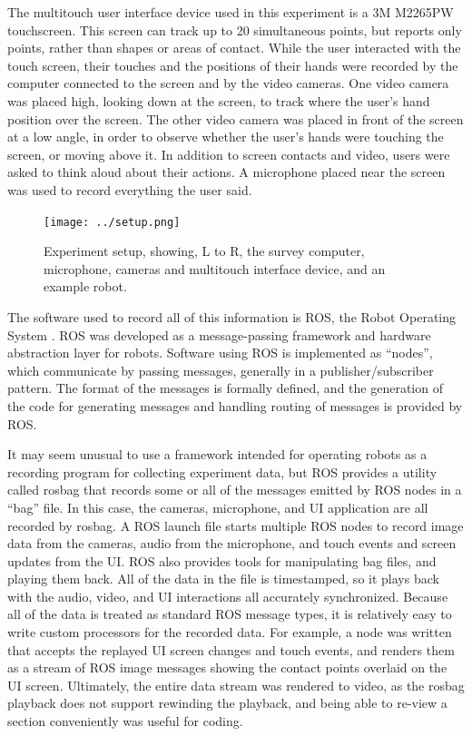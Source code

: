 The multitouch user interface device used in this experiment is a 3M M2265PW touchscreen. 
This screen can track up to 20 simultaneous points, but reports only points, rather than shapes or areas of contact. 
While the user interacted with the touch screen, their touches and the positions of their hands were recorded by the computer connected to the screen and by the video cameras. 
One video camera was placed high, looking down at the screen, to track where the user's hand position over the screen. 
The other video camera was placed in front of the screen at a low angle, in order to observe whether the user's hands were touching the screen, or moving above it. 
In addition to screen contacts and video, users were asked to think aloud about their actions.
A microphone placed near the screen was used to record everything the user said. 

\begin{figure}
	\centering
	\texttt{[image: ../setup.png]}
	\caption{Experiment setup, showing, L to R, the survey computer, microphone, cameras and multitouch interface device, and an example robot.}
	\label{fig:experiment_setup}
\end{figure}

The software used to record all of this information is ROS, the Robot Operating System \citep{ROS_announcement_paper}. 
ROS was developed as a message-passing framework and hardware abstraction layer for robots. 
Software using ROS is implemented as ``nodes'', which communicate by passing messages, generally in a publisher/subscriber pattern. 
The format of the messages is formally defined, and the generation of the code for generating messages and handling routing of messages is provided by ROS. 

It may seem unusual to use a framework intended for operating robots as a recording program for collecting experiment data, but ROS provides a utility called rosbag that records some or all of the messages emitted by ROS nodes in a ``bag'' file. 
In this case, the cameras, microphone, and UI application are all recorded by rosbag.
A ROS launch file starts multiple ROS nodes to record image data from the cameras, audio from the microphone, and touch events and screen updates from the UI.
ROS also provides tools for manipulating bag files, and playing them back. 
All of the data in the file is timestamped, so it plays back with the audio, video, and UI interactions all accurately synchronized. 
Because all of the data is treated as standard ROS message types, it is relatively easy to write custom processors for the recorded data.
For example, a node was written that accepts the replayed UI screen changes and touch events, and renders them as a stream of ROS image messages showing the contact points overlaid on the UI screen. 
Ultimately, the entire data stream was rendered to video, as the rosbag playback does not support rewinding the playback, and being able to re-view a section conveniently was useful for coding. 

